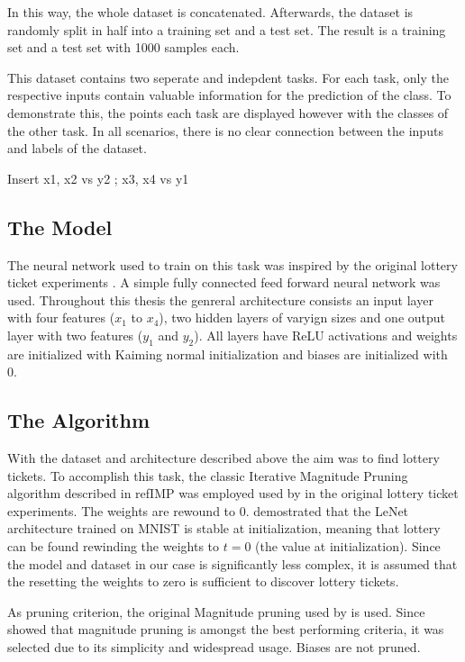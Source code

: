 In this way, the whole dataset is concatenated.
Afterwards, the dataset is randomly split in half into a training set and a test set.
The result is a training set and a test set with 1000 samples each.

This dataset contains two seperate and indepdent tasks.
For each task, only the respective inputs contain valuable information for the prediction of the class.
To demonstrate this, the points each task are displayed however with the classes of the other task.
In all scenarios, there is no clear connection between the inputs and labels of the dataset.

Insert x1, x2 vs y2 ; x3, x4 vs y1

\subsection{The Model}
The neural network used to train on this task was inspired by the original lottery ticket experiments \autocite{DBLP:conf/iclr/FrankleC19}. A simple fully connected feed forward neural network was used.
Throughout this thesis the genreral architecture consists an input layer with four features ($x_1$ to $x_4$), two hidden layers of varyign sizes and one output layer with two features ($y_1$ and $y_2$).
All layers have ReLU activations and weights are initialized with Kaiming normal initialization \autocite{Kaiming} and biases are initialized with 0.

\subsection{The Algorithm}
With the dataset and architecture described above the aim was to find lottery tickets.
To accomplish this task, the classic Iterative Magnitude Pruning algorithm described in refIMP was employed used by \textcite{DBLP:conf/iclr/FrankleC19} in the original lottery ticket experiments.
The weights are rewound to $0$.
\textcite{LinearModeConnectivity} demostrated that the LeNet architecture trained on MNIST is stable at initialization, meaning that lottery can be found rewinding the weights to $t=0$ (the value at initialization). 
Since the model and dataset in our case is significantly less complex, it is assumed that the resetting the weights to zero is sufficient to discover lottery tickets.

As pruning criterion, the original Magnitude pruning used by \autocite{DBLP:conf/iclr/FrankleC19} is used. 
Since \autocite{DBLP:conf/nips/ZhouLLY19} showed that magnitude pruning is amongst the best performing criteria, it was selected due to its simplicity and widespread usage.
Biases are not pruned.

